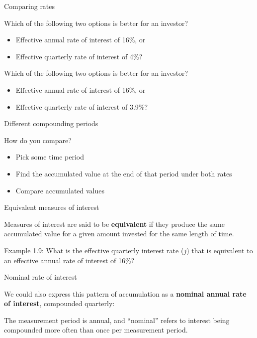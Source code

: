 \documentclass{beamer}
\begin{document}
\begin{frame}{Comparing rates}

Which of the following two options is better for an investor?
\begin{itemize}
\item Effective annual rate of interest of 16\%, or
\item Effective quarterly rate of interest of 4\%?
\end{itemize}

\bigskip
Which of the following two options is better for an investor?
\begin{itemize}
\item Effective annual rate of interest of 16\%, or
\item Effective quarterly rate of interest of 3.9\%?
\end{itemize}

\end{frame}

\begin{frame}{Different compounding periods}

How do you compare?
\begin{itemize}
\item Pick some time period
\item Find the accumulated value at the end of that period under both rates
\item Compare accumulated values
\end{itemize}

\end{frame}

\begin{frame}{Equivalent measures of interest}

Measures of interest are said to be \textbf{equivalent} if they produce the same accumulated value for a given amount invested for the same length of time.

\bigskip
\underline{Example 1.9:} What is the effective quarterly interest rate ($j$) that is equivalent to an effective annual rate of interest of 16\%?

\vfill
\end{frame}

\begin{frame}{Nominal rate of interest}

We could also express this pattern of accumulation as a \textbf{nominal annual rate of interest}, compounded quarterly:

\vspace{3em}
The measurement period is annual, and ``nominal'' refers to interest being compounded more often than once per measurement period.

\end{frame}
\end{document}
